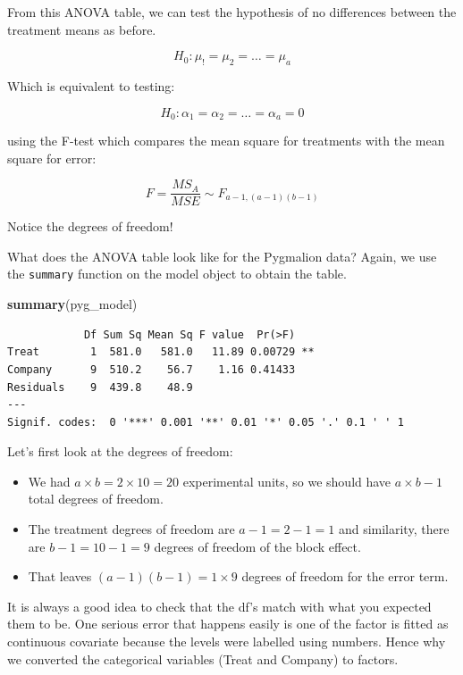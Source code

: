 \documentclass[
  letterpaper,
]{book}
\newenvironment{Shaded}{\begin{snugshade}}{\end{snugshade}}
\newcommand{\FunctionTok}[1]{\textcolor[rgb]{0.13,0.29,0.53}{\textbf{#1}}}
\newcommand{\NormalTok}[1]{#1}
\providecommand{\tightlist}{%
  \setlength{\itemsep}{0pt}\setlength{\parskip}{0pt}}\usepackage{longtable,booktabs,array}
\begin{document}
From this ANOVA table, we can test the hypothesis of no differences
between the treatment means as before.

\[H_0: \mu_! = \mu_2 = \ldots =\mu_a\]

Which is equivalent to testing:

\[
H_0 : \alpha_1 = \alpha_2 = \dots = \alpha_a = 0
\]

using the F-test which compares the mean square for treatments with the
mean square for error:

\[
F = \frac{MS_A}{MSE} \sim F_{a-1, (a-1)(b-1)}
\]

Notice the degrees of freedom!

What does the ANOVA table look like for the Pygmalion data? Again, we
use the \texttt{summary} function on the model object to obtain the
table.

\begin{Shaded}
\begin{Highlighting}[]
\FunctionTok{summary}\NormalTok{(pyg\_model)}
\end{Highlighting}
\end{Shaded}

\begin{verbatim}
            Df Sum Sq Mean Sq F value  Pr(>F)   
Treat        1  581.0   581.0   11.89 0.00729 **
Company      9  510.2    56.7    1.16 0.41433   
Residuals    9  439.8    48.9                   
---
Signif. codes:  0 '***' 0.001 '**' 0.01 '*' 0.05 '.' 0.1 ' ' 1
\end{verbatim}

Let's first look at the degrees of freedom:

\begin{itemize}
\tightlist
\item
  We had \(a \times b = 2 \times 10 = 20\) experimental units, so we
  should have \(a \times b - 1\) total degrees of freedom.
\item
  The treatment degrees of freedom are \(a-1 = 2-1 = 1\) and similarity,
  there are \(b-1 = 10 -1=9\) degrees of freedom of the block effect.
\item
  That leaves \((a-1)(b-1) = 1 \times 9\) degrees of freedom for the
  error term.
\end{itemize}

It is always a good idea to check that the df's match with what you
expected them to be. One serious error that happens easily is one of the
factor is fitted as continuous covariate because the levels were
labelled using numbers. Hence why we converted the categorical variables
(Treat and Company) to factors.
\end{document}
